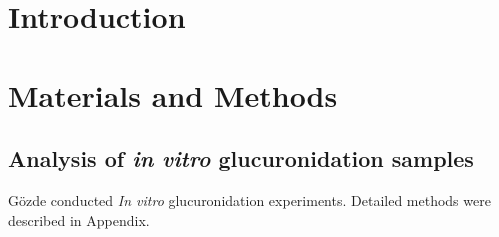 \section{Introduction}





\section{Materials and Methods}
	\subsection{Analysis of \textit{in vitro} glucuronidation samples}
	Gözde conducted \textit{In vitro} glucuronidation experiments. Detailed methods were described in Appendix.
	
